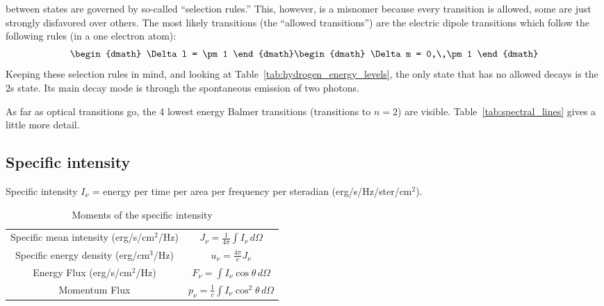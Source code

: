 \begin{enumerate}
      between states are governed by so-called ``selection rules.''
      This, however, is a misnomer because every transition is allowed, some are just strongly
      disfavored over others.  The most likely transitions (the ``allowed transitions'') are
      the electric dipole transitions which follow the following rules (in a one electron atom):
      \begin{dgroup}
      \begin{dmath}
        \Delta l = \pm 1
      \end{dmath}
      \begin{dmath}
        \Delta m = 0,\,\pm1
      \end{dmath}
      \end{dgroup}
      Keeping these selection rules in mind, and looking at Table~\ref{tab:hydrogen_energy_levels},
      the only state that has no allowed decays is the 2s state.  Its main decay mode is through
      the spontaneous emission of two photons.
      
      As far as optical transitions go, the 4 lowest energy Balmer transitions (transitions
      to $n=2$) are visible.  Table~\ref{tab:spectral_lines} gives a little more detail.

\end{enumerate}

\subsection{Specific intensity}
Specific intensity $I_{\nu}$ = energy per time per area per frequency per
steradian (erg/s/Hz/ster/cm$^2$).

\begin{table}[ht]
\begin{tabular}{cc}
\hline\hline
Specific mean intensity (erg/s/cm$^2$/Hz) &
    $J_{\nu}=\frac{1}{4\pi}\int I_{\nu}\,d\Omega$ \\
Specific energy density (erg/cm$^3$/Hz) &
    $u_{\nu}=\frac{4\pi}{c}J_{\nu}$ \\
Energy Flux (erg/s/cm$^2$/Hz) &
    $F_{\nu}=\int I_{\nu}\cos \theta\,d\Omega$ \\
Momentum Flux &
    $p_{\nu}=\frac{1}{c}\int I_{\nu}\cos^2 \theta\,d\Omega$ \\
\hline\hline
\end{tabular}
\caption{Moments of the specific intensity}
\end{table}

